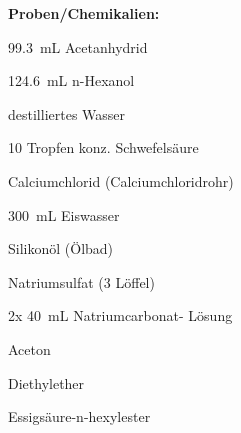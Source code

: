 \textbf{Proben/Chemikalien:}
\begin{itemize}
	\begin{minipage}{0.55 \textwidth}
		\item \SI{99,3}{\milli \liter} Acetanhydrid
		\item \SI{124,6}{\milli \liter} n-Hexanol
		\item destilliertes Wasser
		\item 10 Tropfen konz. Schwefelsäure
		\item Calciumchlorid (Calciumchloridrohr)
		\item \SI{300}{\milli \liter} Eiswasser
		\item Silikonöl (Ölbad)
	\end{minipage}
\begin{minipage}{0.35 \textwidth}
		\item Natriumsulfat (3 Löffel)
		\item 2x \SI{40}{\milli \liter} Natriumcarbonat- Lösung
		\item Aceton
		\item Diethylether
		\item Essigsäure-n-hexylester
\end{minipage}
\end{itemize}



